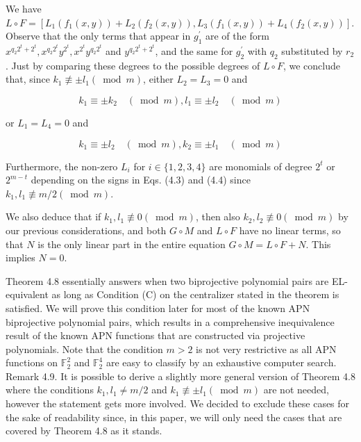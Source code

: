 \documentclass[10pt]{article}
\begin{document}
We have $L \circ F=\left[L_{1}\left(f_{1}(x, y)\right)+L_{2}\left(f_{2}(x, y)\right), L_{3}\left(f_{1}(x, y)\right)+L_{4}\left(f_{2}(x, y)\right)\right]$. Observe that the only terms that appear in $g_{1}^{\prime}$ are of the form $x^{q_{2} 2^{t}+2^{t}}, x^{q_{2} 2^{t}} y^{2^{t}}, x^{2^{t}} y^{q_{2} 2^{t}}$ and $y^{q_{2} 2^{t}+2^{t}}$, and the same for $g_{2}^{\prime}$ with $q_{2}$ substituted by $r_{2}$. Just by comparing these degrees to the possible degrees of $L \circ F$, we conclude that, since $k_{1} \not \equiv \pm l_{1}(\bmod m)$, either $L_{2}=L_{3}=0$ and


\begin{equation*}
k_{1} \equiv \pm k_{2} \quad(\bmod m), l_{1} \equiv \pm l_{2} \quad(\bmod m) \tag{4.3}
\end{equation*}


or $L_{1}=L_{4}=0$ and


\begin{equation*}
k_{1} \equiv \pm l_{2} \quad(\bmod m), k_{2} \equiv \pm l_{1} \quad(\bmod m) \tag{4.4}
\end{equation*}


Furthermore, the non-zero $L_{i}$ for $i \in\{1,2,3,4\}$ are monomials of degree $2^{t}$ or $2^{m-t}$ depending on the signs in Eqs. (4.3) and (4.4) since $k_{1}, l_{1} \not \equiv m / 2(\bmod m)$.

We also deduce that if $k_{1}, l_{1} \not \equiv 0(\bmod m)$, then also $k_{2}, l_{2} \not \equiv 0(\bmod m)$ by our previous considerations, and both $G \circ M$ and $L \circ F$ have no linear terms, so that $N$ is the only linear part in the entire equation $G \circ M=L \circ F+N$. This implies $N=0$.

Theorem 4.8 essentially answers when two biprojective polynomial pairs are EL-equivalent as long as Condition (C) on the centralizer stated in the theorem is satisfied. We will prove this condition later for most of the known APN biprojective polynomial pairs, which results in a comprehensive inequivalence result of the known APN functions that are constructed via projective polynomials. Note that the condition $m>2$ is not very restrictive as all APN functions on $\mathbb{F}_{2}^{2}$ and $\mathbb{F}_{2}^{4}$ are easy to classify by an exhaustive computer search.\\
Remark 4.9. It is possible to derive a slightly more general version of Theorem 4.8 where the conditions $k_{1}, l_{1} \neq m / 2$ and $k_{1} \not \equiv \pm l_{1}(\bmod m)$ are not needed, however the statement gets more involved. We decided to exclude these cases for the sake of readability since, in this paper, we will only need the cases that are covered by Theorem 4.8 as it stands.
\end{document}
